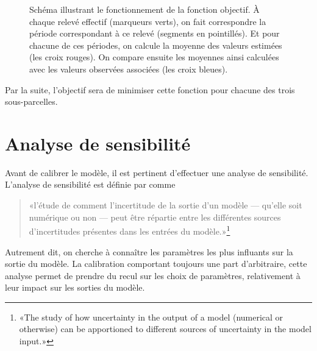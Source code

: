 \begin{figure}[ht]
\caption{Schéma illustrant le fonctionnement de la fonction objectif. À chaque relevé effectif (marqueurs verts), on fait correspondre la période correspondant à ce relevé (segments en pointillés).
Et pour chacune de ces périodes, on calcule la moyenne des valeurs estimées (les croix rouges). On compare ensuite les moyennes ainsi calculées avec les valeurs observées associées (les croix bleues).}
\label{fig:calib}
\end{figure}


Par la suite, l'objectif sera de minimiser cette fonction pour chacune des trois sous-parcelles.

\section{Analyse de sensibilité}

Avant de calibrer le modèle, il est pertinent d'effectuer une analyse de sensibilité.
L'analyse de sensibilité est définie par \citet{saltelli2004} comme
\begin{quote}
 «l'étude de comment l'incertitude de la sortie d'un modèle --- qu'elle soit numérique ou non --- peut être répartie entre les différentes sources d'incertitudes présentes dans les entrées du modèle.»\footnote{«The study of how uncertainty in the output of a model (numerical or otherwise) can be apportioned to different sources of uncertainty in the model input.»}
\end{quote}
Autrement dit, on cherche à connaître les paramètres les plus influants sur la sortie du modèle.
La calibration comportant toujours une part d'arbitraire, cette analyse permet de prendre du recul sur les choix de paramètres, relativement à leur impact sur les sorties du modèle.

